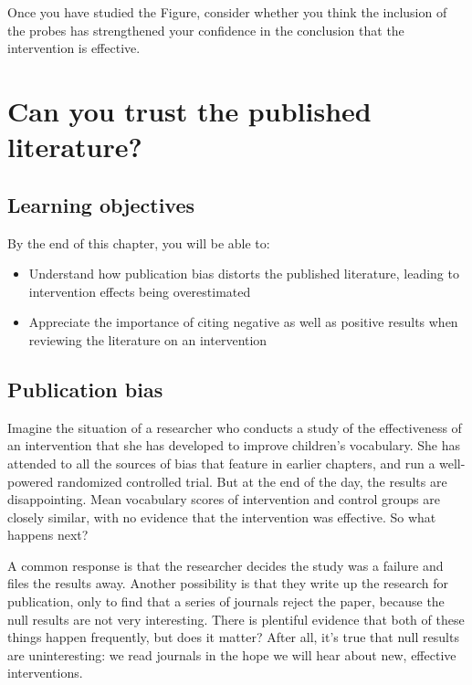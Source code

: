 \documentclass{krantz}
\begin{document}
Once you have studied the Figure, consider whether you think the inclusion of the probes has strengthened your confidence in the conclusion that the intervention is effective.

\hypertarget{pubbias}{%
\chapter{Can you trust the published literature?}\label{pubbias}}

\hypertarget{learning-objectives-18}{%
\section{Learning objectives}\label{learning-objectives-18}}

By the end of this chapter, you will be able to:

\begin{itemize}
\item
  Understand how publication bias distorts the published literature, leading to intervention effects being overestimated
\item
  Appreciate the importance of citing negative as well as positive results when reviewing the literature on an intervention
\end{itemize}

\hypertarget{publication-bias}{%
\section{Publication bias}\label{publication-bias}}

Imagine the situation of a researcher who conducts a study of the effectiveness of an intervention that she has developed to improve children's vocabulary. She has attended to all the sources of bias that feature in earlier chapters, and run a well-powered randomized controlled trial. But at the end of the day, the results are disappointing. Mean vocabulary scores of intervention and control groups are closely similar, with no evidence that the intervention was effective. So what happens next?

A common response is that the researcher decides the study was a failure and files the results away. Another possibility is that they write up the research for publication, only to find that a series of journals reject the paper, because the null results are not very interesting. There is plentiful evidence that both of these things happen frequently, but does it matter? After all, it's true that null results are uninteresting: we read journals in the hope we will hear about new, effective interventions.
\end{document}
